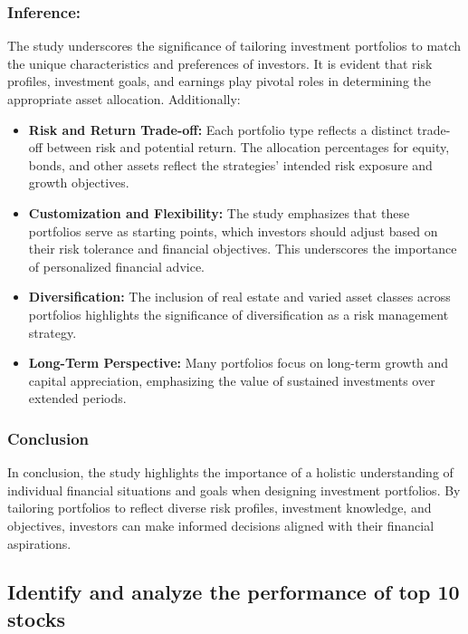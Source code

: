 \subsubsection{Inference:}

The study underscores the significance of tailoring investment portfolios to match the unique characteristics and preferences of investors. It is evident that risk profiles, investment goals, and earnings play pivotal roles in determining the appropriate asset allocation. Additionally:

\begin{itemize}
    \item \textbf{Risk and Return Trade-off:} Each portfolio type reflects a distinct trade-off between risk and potential return. The allocation percentages for equity, bonds, and other assets reflect the strategies' intended risk exposure and growth objectives.
    
    \item \textbf{Customization and Flexibility:} The study emphasizes that these portfolios serve as starting points, which investors should adjust based on their risk tolerance and financial objectives. This underscores the importance of personalized financial advice.
    
    \item \textbf{Diversification:} The inclusion of real estate and varied asset classes across portfolios highlights the significance of diversification as a risk management strategy.
    
    \item \textbf{Long-Term Perspective:} Many portfolios focus on long-term growth and capital appreciation, emphasizing the value of sustained investments over extended periods.
\end{itemize}
\subsubsection{Conclusion}
In conclusion, the study highlights the importance of a holistic understanding of individual financial situations and goals when designing investment portfolios. By tailoring portfolios to reflect diverse risk profiles, investment knowledge, and objectives, investors can make informed decisions aligned with their financial aspirations.

\subsection{Identify and analyze the performance of top 10 stocks}

